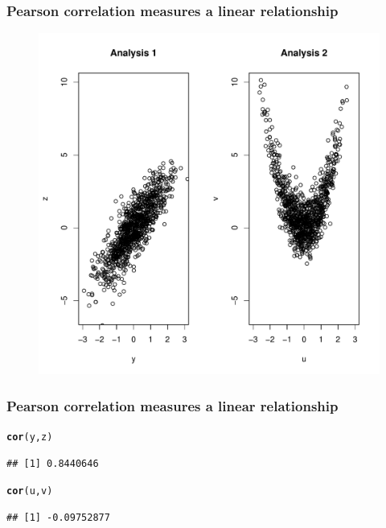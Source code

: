 \documentclass[compress]{beamer}\usepackage[]{graphicx}\usepackage[]{xcolor}
\makeatletter
\def\maxwidth{ %
  \ifdim\Gin@nat@width>\linewidth
    \linewidth
  \else
    \Gin@nat@width
  \fi
}
\newcommand{\hlstd}[1]{\textcolor[rgb]{0.345,0.345,0.345}{#1}}%
\newcommand{\hlkwd}[1]{\textcolor[rgb]{0.737,0.353,0.396}{\textbf{#1}}}%
\newenvironment{kframe}{%
 \def\at@end@of@kframe{}%
 \ifinner\ifhmode%
  \def\at@end@of@kframe{\end{minipage}}%
  \begin{minipage}{\columnwidth}%
 \fi\fi%
 \def\FrameCommand##1{\hskip\@totalleftmargin \hskip-\fboxsep
 \colorbox{shadecolor}{##1}\hskip-\fboxsep
     \hskip-\linewidth \hskip-\@totalleftmargin \hskip\columnwidth}%
 \MakeFramed {\advance\hsize-\width
   \@totalleftmargin\z@ \linewidth\hsize
   \@setminipage}}%
 {\par\unskip\endMakeFramed%
 \at@end@of@kframe}
\newenvironment{knitrout}{}{} %
\makeatother
\begin{document}
\begin{frame}[fragile]
  \frametitle{Pearson correlation measures a linear relationship}
    

    \begin{figure}[!htpb]
      \begin{center}
\begin{knitrout}
\color{fgcolor}
\includegraphics[width=\maxwidth]{figure/plot21-1} 
\end{knitrout}
      \end{center}
    \end{figure}
\end{frame}


\begin{frame}[fragile]
  \frametitle{Pearson correlation measures a linear relationship}
\begin{knitrout}
\color{fgcolor}\begin{kframe}
\begin{alltt}
  \hlkwd{cor}\hlstd{(y, z)}
\end{alltt}
\begin{verbatim}
## [1] 0.8440646
\end{verbatim}
\begin{alltt}
  \hlkwd{cor}\hlstd{(u, v)}
\end{alltt}
\begin{verbatim}
## [1] -0.09752877
\end{verbatim}
\end{kframe}
\end{knitrout}
\end{frame}
\end{document}
